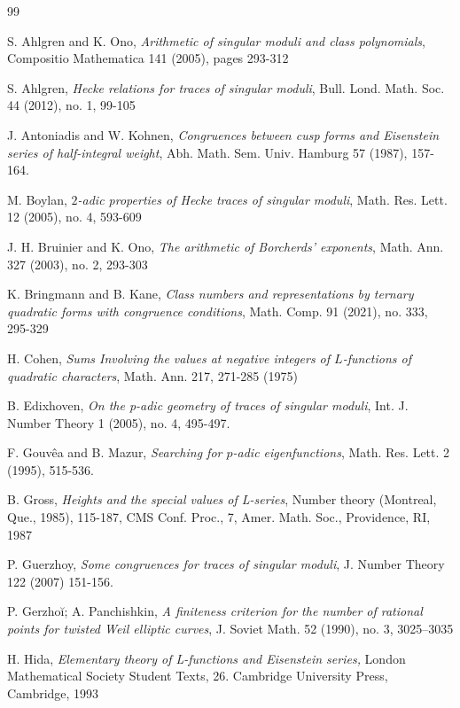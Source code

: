 \documentclass[11pt,letterpaper]{amsart}
\theoremstyle{remark}
\begin{document}
\begin{thebibliography}{99}

 S. Ahlgren and K. Ono, {\it Arithmetic of singular moduli and class polynomials}, Compositio Mathematica 141 (2005), pages 293-312

 S. Ahlgren, 
{\it Hecke relations for traces of singular moduli},
Bull. Lond. Math. Soc. 44 (2012), no. 1, 99-105

 J. Antoniadis and W. Kohnen,
{\it Congruences between cusp forms and Eisenstein series of half-integral weight},
Abh. Math. Sem. Univ. Hamburg 57 (1987), 157-164.

 M. Boylan,
{\it $2$-adic properties of Hecke traces of singular moduli},
Math. Res. Lett. 12 (2005), no. 4, 593-609

 J. H. Bruinier and K. Ono, {\it The arithmetic of Borcherds' exponents}, Math. Ann. 327 (2003), no. 2, 293-303

 K. Bringmann and B. Kane, 
{\it Class numbers and representations by ternary quadratic forms with congruence conditions},
Math. Comp. 91 (2021), no. 333, 295-329

 H. Cohen, {\it Sums Involving the values at negative integers of
$L$-functions of quadratic characters}, Math. Ann. 217, 271-285 (1975)  

 B. Edixhoven, 
{\it On the p-adic geometry of traces of singular moduli}, 
Int. J. Number Theory 1 (2005), no. 4, 495-497.

 F. Gouv\^ea and B. Mazur, { \it Searching for $p$-adic eigenfunctions}, Math. Res. Lett. 2 (1995), 515-536.

  B. Gross,  {\it Heights and the special values of L-series}, Number theory (Montreal, Que., 1985), 115-187, CMS Conf. Proc., 7, Amer. Math. Soc., Providence, RI, 1987

 P. Guerzhoy, {\it Some congruences for traces of singular moduli}, J. Number Theory 122 (2007) 151-156.

 P. Gerzhoĭ; A. Panchishkin, 
{\it A finiteness criterion for the number of rational points for twisted Weil elliptic curves}, 
J. Soviet Math. 52 (1990), no. 3, 3025–3035

 H. Hida, {\it Elementary theory of L-functions and Eisenstein series,} London Mathematical Society Student Texts, 26. Cambridge University Press, Cambridge, 1993


\end{thebibliography}
\end{document}
